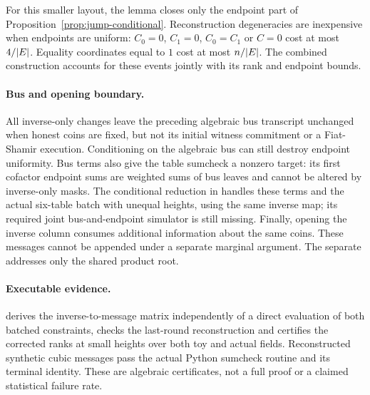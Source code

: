 For this smaller layout, the lemma closes only the endpoint part of Proposition~\ref{prop:jump-conditional}. Reconstruction degeneracies are inexpensive when endpoints are uniform: $C_0=0$, $C_1=0$, $C_0=C_1$ or $C=0$ cost at most $4/|E|$. Equality coordinates equal to $1$ cost at most $n/|E|$. The combined construction accounts for these events jointly with its rank and endpoint bounds.

\paragraph{Bus and opening boundary.} All inverse-only changes leave the preceding algebraic bus transcript unchanged when honest coins are fixed, but not its initial witness commitment or a Fiat-Shamir execution. Conditioning on the algebraic bus can still destroy endpoint uniformity. Bus terms also give the table sumcheck a nonzero target: its first cofactor endpoint sums are weighted sums of bus leaves and cannot be altered by inverse-only masks. The conditional reduction in  handles these terms and the actual six-table batch with unequal heights, using the same inverse map; its required joint bus-and-endpoint simulator is still missing. Finally, opening the inverse column consumes additional information about the same coins. These messages cannot be appended under a separate marginal argument. The separate  addresses only the shared product root.

\paragraph{Executable evidence.}  derives the inverse-to-message matrix independently of a direct evaluation of both batched constraints, checks the last-round reconstruction and certifies the corrected ranks at small heights over both toy and actual fields. Reconstructed synthetic cubic messages pass the actual Python sumcheck routine and its terminal identity. These are algebraic certificates, not a full proof or a claimed statistical failure rate.
